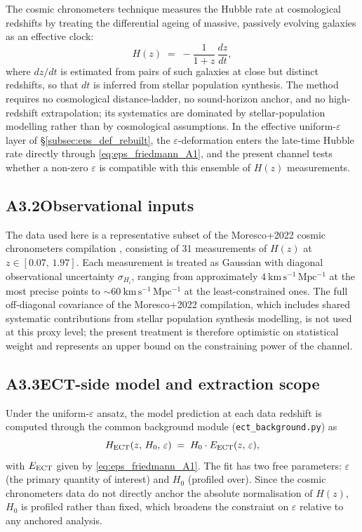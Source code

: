 The cosmic chronometers technique measures the Hubble rate at
cosmological redshifts by treating the differential ageing of
massive, passively evolving galaxies as an effective clock:
\begin{equation}
H(z) \;=\; -\frac{1}{1+z}\,\frac{dz}{dt},
\end{equation}
where $dz/dt$ is estimated from pairs of such galaxies at close
but distinct redshifts, so that $dt$ is inferred from stellar
population synthesis. The method requires no cosmological
distance-ladder, no sound-horizon anchor, and no high-redshift
extrapolation; its systematics are dominated by stellar-population
modelling rather than by cosmological assumptions. In the
effective uniform-$\varepsilon$ layer of
\S\ref{subsec:eps_def_rebuilt}, the $\varepsilon$-deformation enters
the late-time Hubble rate directly through
\eqref{eq:eps_friedmann_A1}, and the present channel tests whether
a non-zero $\varepsilon$ is compatible with this ensemble of
$H(z)$ measurements.

\subsection*{A3.2\quad Observational inputs}

The data used here is a representative subset of the Moresco+2022
cosmic chronometers compilation \cite{Moresco2022}, consisting of
31 measurements of $H(z)$ at $z \in [0.07,\,1.97]$. Each
measurement is treated as Gaussian with diagonal observational
uncertainty $\sigma_{H_i}$, ranging from approximately
$4~\mathrm{km\,s^{-1}\,Mpc^{-1}}$ at the most precise points to
$\sim 60~\mathrm{km\,s^{-1}\,Mpc^{-1}}$ at the least-constrained
ones. The full off-diagonal covariance of the Moresco+2022
compilation, which includes shared systematic contributions from
stellar population synthesis modelling, is not used at this
proxy level; the present treatment is therefore optimistic on
statistical weight and represents an upper bound on the
constraining power of the channel.

\subsection*{A3.3\quad ECT-side model and extraction scope}

Under the uniform-$\varepsilon$ ansatz, the model prediction at
each data redshift is computed through the common background
module (\texttt{ect\_background.py}) as
\begin{equation}
H_{\rm ECT}(z,\, H_0,\, \varepsilon)
\;=\; H_0 \cdot E_{\rm ECT}(z,\, \varepsilon),
\end{equation}
with $E_{\rm ECT}$ given by \eqref{eq:eps_friedmann_A1}. The fit
has two free parameters: $\varepsilon$ (the primary quantity of
interest) and $H_0$ (profiled over). Since the cosmic chronometers
data do not directly anchor the absolute normalisation of $H(z)$,
$H_0$ is profiled rather than fixed, which broadens the constraint
on $\varepsilon$ relative to any anchored analysis.

